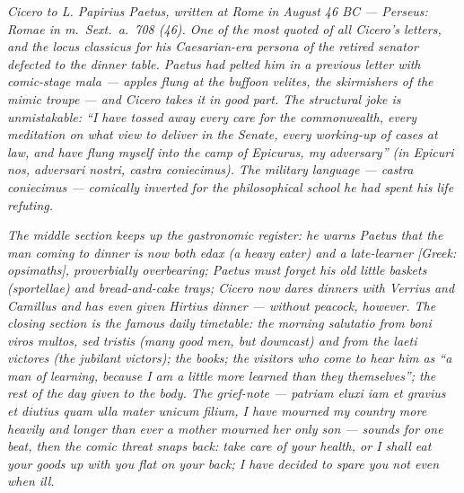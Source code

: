 
\textit{Cicero to L. Papirius Paetus, written at Rome in August
46 BC --- Perseus: \textit{Romae in m.~Sext.~a.~708 (46)}. One of
the most quoted of all Cicero's letters, and the locus
classicus for his Caesarian-era persona of the retired senator
defected to the dinner table. Paetus had pelted him in a
previous letter with comic-stage \textit{mala} --- apples flung
at the buffoon \textit{velites}, the skirmishers of the mimic
troupe --- and Cicero takes it in good part. The structural joke
is unmistakable: ``I have tossed away every care for the
commonwealth, every meditation on what view to deliver in the
Senate, every working-up of cases at law, and have flung myself
into the camp of Epicurus, my adversary'' (\textit{in Epicuri
nos, adversari nostri, castra coniecimus}). The military
language --- \textit{castra coniecimus} --- comically inverted
for the philosophical school he had spent his life refuting.}

\textit{The middle section keeps up the gastronomic register: he
warns Paetus that the man coming to dinner is now both
\textit{edax} (a heavy eater) and a \textit{late-learner}
\textit{[Greek: opsimaths]}, proverbially overbearing; Paetus
must forget his old little baskets (\textit{sportellae}) and
bread-and-cake trays; Cicero now dares dinners with Verrius and
Camillus and has even given Hirtius dinner --- without peacock,
however. The closing section is the famous daily timetable: the
morning \textit{salutatio} from \textit{boni viros multos, sed
tristis} (many good men, but downcast) and from the
\textit{laeti victores} (the jubilant victors); the books; the
visitors who come to hear him as ``a man of learning, because I
am a little more learned than they themselves''; the rest of the
day given to the body. The grief-note --- \textit{patriam eluxi
iam et gravius et diutius quam ulla mater unicum filium}, I have
mourned my country more heavily and longer than ever a mother
mourned her only son --- sounds for one beat, then the comic
threat snaps back: take care of your health, or I shall eat your
goods up with you flat on your back; I have decided to spare you
not even when ill.}
